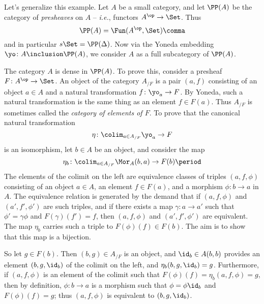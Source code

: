 \begin{eg}
  Let's generalize this example.
  Let $A$ be a small category, and let $\PP(A)$ be the category of \emph{presheaves} on $A$ --
  \emph{i.e.}, functors $A^{\op} \to \Set$.
  Thus
  \[
    \PP(A) = \Fun(A^{\op}, \Set) \comma
  \]
  and in particular $s\Set = \PP(\Delta)$.
  Now via the Yoneda embedding $\yo \colon A \inclusion \PP(A)$, we consider $A$ as a full subcategory of $\PP(A)$.

  The category $A$ is dense in $\PP(A)$.
  To prove this, consider a presheaf $F \colon A^{\op} \to \Set$.
  An object of the category $A_{/F}$ is a pair $(a,f)$ consisting of an object $a \in A$ and a natural transformation $f \colon \yo_a \to F$.
  By Yoneda, such a natural transformation is the same thing as an element $f \in F(a)$.
  Thus $A_{/F}$ is sometimes called the \emph{category of elements of $F$}.
  To prove that the canonical natural transformation
  \[
    \eta \colon \colim_{a \in A_{/F}} \yo_a \to F
  \]
  is an isomorphism, let $b \in A$ be an object, and consider the map
  \[
    \eta_b \colon \colim_{a \in A_{/F}} \Mor_A(b,a) \to F(b) \period
  \]
  The elements of the colimit on the left are equivalence classes of triples $(a,f,\phi)$ consisting of an object $a \in A$, an element $f \in F(a)$, and a morphism $\phi \colon b \to a$ in $A$.
  The equivalence relation is generated by the demand that if $(a,f,\phi)$ and $(a',f',\phi')$ are such triples, and if there exists a map $\gamma \colon a \to a'$ such that $\phi' = \gamma\phi$ and $F(\gamma)(f') = f$, then $(a,f,\phi)$ and $(a',f',\phi')$ are equivalent.
  The map $\eta_b$ carries such a triple to $F(\phi)(f) \in F(b)$.
  The aim is to show that this map is a bijection.

  So let $g \in F(b)$.
  Then $(b,g) \in A_{/F}$ is an object, and $\id_b \in A(b,b)$ provides an element $(b,g,\id_b)$ of the colimit on the left, and $\eta_b(b,g,\id_b) = g$.
  Furthermore, if $(a,f,\phi)$ is an element of the colimit such that $F(\phi)(f) = \eta_b(a,f,\phi) = g$, then
  by definition, $\phi \colon b \to a$ is a morphism such that $\phi = \phi \id_b$ and $F(\phi)(f) = g$;
  thus $(a,f,\phi)$ is equivalent to $(b,g,\id_b)$.
\end{eg}

